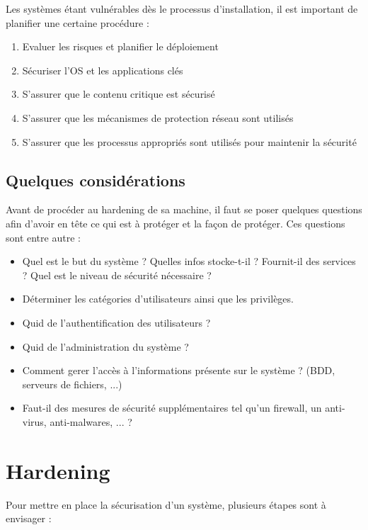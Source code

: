 \documentclass{report}
\begin{document}
Les systèmes étant vulnérables dès le processus d'installation, il est important de planifier une certaine procédure :

\begin{enumerate}
    \item Evaluer les risques et planifier le déploiement
    \item Sécuriser l'OS et les applications clés
    \item S'assurer que le contenu critique est sécurisé
    \item S'assurer que les mécanismes de protection réseau sont utilisés
    \item S'assurer que les processus appropriés sont utilisés pour maintenir la sécurité
\end{enumerate}

\subsection{Quelques considérations}

Avant de procéder au hardening de sa machine, il faut se poser quelques questions afin d'avoir en tête ce qui est à protéger et la façon de protéger. Ces questions sont entre autre :

\begin{itemize}
    \item Quel est le but du système ? Quelles infos stocke-t-il ? Fournit-il des services ? Quel est le niveau de sécurité nécessaire ?
    \item Déterminer les catégories d'utilisateurs ainsi que les privilèges.
    \item Quid de l'authentification des utilisateurs ?
    \item Quid de l'administration du système ?
    \item Comment gerer l'accès à l'informations présente sur le système ? (BDD, serveurs de fichiers, ...)
    \item Faut-il des mesures de sécurité supplémentaires tel qu'un firewall, un anti-virus, anti-malwares, ... ?
\end{itemize}

\section{Hardening}

Pour mettre en place la sécurisation d'un système, plusieurs étapes sont à envisager :
\end{document}
